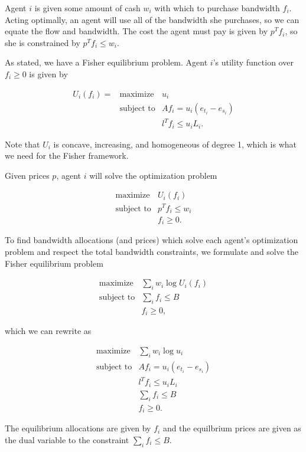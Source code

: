 \documentclass[12pt]{article}
\begin{document}
Agent $i$ is given some amount of cash $w_i$ with which to purchase bandwidth
$f_i$. Acting optimally, an agent will use all of the bandwidth she purchases,
so we can equate the flow and bandwidth. The cost the agent must pay is given
by $p^T f_i$, so she is constrained by $p^T f_i \leq w_i$.

As stated, we have a Fisher equilibrium problem. Agent $i$'s utility function
over $f_i \geq 0$ is given by

$$
\begin{array}{lll}
  U_i(f_i) = &\mbox{maximize} & u_i \\
  &\mbox{subject to} & A f_i = u_i(e_{t_i} - e_{s_i})\\
  && l^T f_i \leq u_i L_i.
\end{array}
$$

Note that $U_i$ is concave, increasing, and homogeneous of degree 1, which is
what we need for the Fisher framework.

Given prices $p$, agent $i$ will solve the optimization problem

$$
\begin{array}{ll}
  \mbox{maximize} & U_i(f_i) \\
  \mbox{subject to} & p^T f_i \leq w_i \\
  & f_i \geq 0.
\end{array}
$$

To find bandwidth allocations (and prices) which solve each agent's
optimization problem and respect the total bandwidth constraints, we formulate
and solve the Fisher equilibrium problem

$$
\begin{array}{ll}
  \mbox{maximize} & \sum_i w_i\log U_i(f_i) \\
  \mbox{subject to} & \sum_i f_i \leq B\\
  & f_i \geq 0,
\end{array}
$$

which we can rewrite as

$$
\begin{array}{ll}
  \mbox{maximize} & \sum_i w_i\log u_i \\
  \mbox{subject to} & A f_i = u_i(e_{t_i} - e_{s_i})\\
  & l^T f_i \leq u_i L_i\\
  & \sum_i f_i \leq B \\
  & f_i \geq 0.
\end{array}
$$

The equilibrium allocations are given by $f_i$ and the equilbrium prices are
given as the dual variable to the constraint $\sum_i f_i \leq B$.
\end{document}
